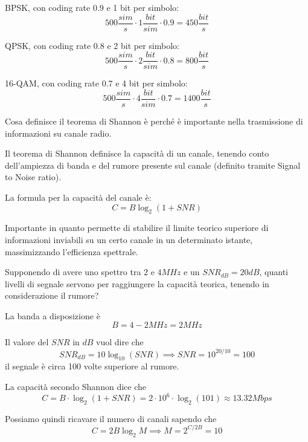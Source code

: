 \begin{questions}
\begin{solution}
        BPSK, con coding rate 0.9 e 1 bit per simbolo: 
        $$ 500 \frac{sim}{s} \cdot 1 \frac{bit}{sim} \cdot 0.9 = 450 \frac{bit}{s} $$
        
        QPSK, con coding rate 0.8 e 2 bit per simbolo: 
        $$ 500 \frac{sim}{s} \cdot 2 \frac{bit}{sim} \cdot 0.8 = 800 \frac{bit}{s} $$
        
        16-QAM, con coding rate 0.7 e 4 bit per simbolo: 
        $$ 500 \frac{sim}{s} \cdot 4 \frac{bit}{sim} \cdot 0.7 = 1400 \frac{bit}{s} $$
    \end{solution}
    
    \question Cosa definisce il teorema di Shannon è perché è importante nella trasmissione di informazioni su canale radio. 
    
    \begin{solution}
        Il teorema di Shannon definisce la capacità di un canale, tenendo conto dell'ampiezza di banda e del rumore presente sul canale (definito tramite Signal to Noise ratio).
        
        La formula per la capacità del canale è: 
        $$ C = B \log_2 (1 + SNR) $$
        
        Importante in quanto permette di stabilire il limite teorico superiore di informazioni inviabili su un certo canale in un determinato istante, massimizzando l'efficienza spettrale.
    \end{solution}
    
    \question Supponendo di avere uno spettro tra $2$ e $4MHz$ e un $SNR_{dB} = 20dB$, quanti livelli di segnale servono per raggiungere la capacità teorica, tenendo in considerazione il rumore? 
    
    \begin{solution}
        La banda a disposizione è
        $$ B = 4 - 2 MHz = 2MHz $$
        
        Il valore del $SNR$ in $dB$ vuol dire che
        $$ SNR_{dB} = 10 \log_{10} (SNR) \implies SNR = 10^{20/10} = 100 $$
        il segnale è circa 100 volte superiore al rumore.
        
        La capacità secondo Shannon dice che
        $$ C = B \cdot \log_2 (1 + SNR) = 2 \cdot 10^6 \cdot \log_2 (101) \approx 13.32 Mbps $$
        
        Possiamo quindi ricavare il numero di canali sapendo che
        $$ C = 2 B \log_2 M \implies M = 2^{C/2B} = 10 $$
    \end{solution}
\end{questions}